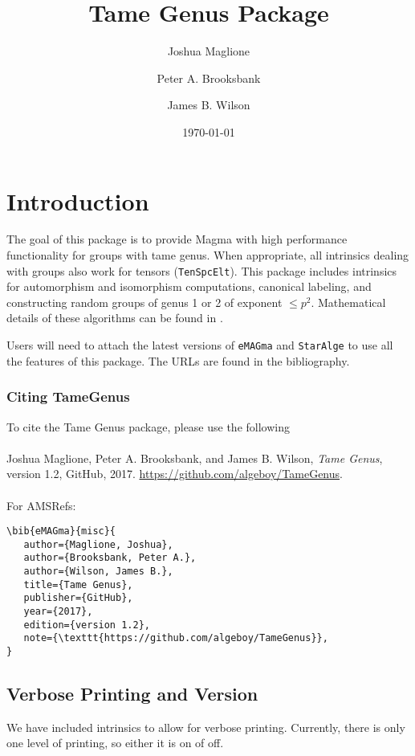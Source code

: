 \documentclass{documentation}
\title{Tame Genus Package}
\author{Joshua Maglione}
\author{Peter A. Brooksbank}
\author{James B. Wilson}
\date{\today}
\begin{document}
\frontmatter

\maketitle
\tableofcontents

\mainmatter

\chapter{Introduction}

The goal of this package is to provide {\sc Magma} \cite{Magma} with high performance functionality for groups with tame genus. 
When appropriate, all intrinsics dealing with groups also work for tensors ({\tt TenSpcElt}). 
This package includes intrinsics for automorphism and isomorphism computations, canonical labeling, and constructing random groups of genus 1 or 2 of exponent  $\leq p^2$. 
Mathematical details of these algorithms can be found in \cite{BMW}.

Users will need to attach the latest versions of \texttt{eMAGma} \cite{eMAGma} and \texttt{StarAlge} \cite{StarAlge} to use all the features of this package. 
The URLs are found in the bibliography. 

\subsection*{Citing TameGenus} 
To cite the Tame Genus package, please use the following\\
\\
Joshua Maglione, Peter A. Brooksbank, and James B. Wilson, \emph{Tame Genus}, version 1.2, GitHub, 2017. \url{https://github.com/algeboy/TameGenus}. \\
\\
For AMSRefs:
\begin{verbatim}
\bib{eMAGma}{misc}{
   author={Maglione, Joshua},
   author={Brooksbank, Peter A.},
   author={Wilson, James B.},
   title={Tame Genus},
   publisher={GitHub},
   year={2017},
   edition={version 1.2},
   note={\texttt{https://github.com/algeboy/TameGenus}},
}
\end{verbatim}


\section{Verbose Printing and Version}

We have included intrinsics to allow for verbose printing. 
Currently, there is only one level of printing, so either it is on of off. 
\end{document}
